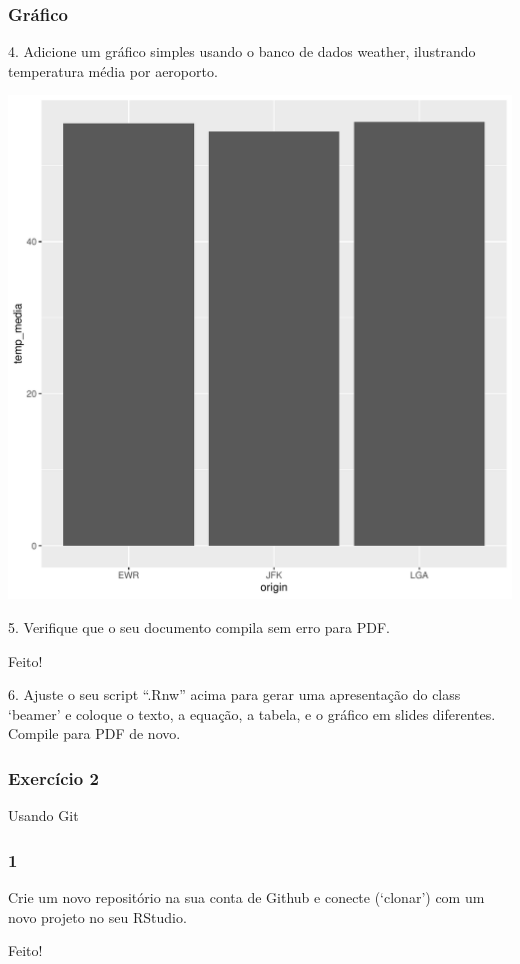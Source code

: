 \documentclass{beamer}\usepackage[]{graphicx}\usepackage[]{xcolor}
\makeatletter
\def\maxwidth{ %
  \ifdim\Gin@nat@width>\linewidth
    \linewidth
  \else
    \Gin@nat@width
  \fi
}
\newenvironment{knitrout}{}{} %
\makeatother
\begin{document}
\begin{frame}[fragile]
\frametitle{Gráfico}
4. Adicione um gráfico simples usando o banco de dados weather, ilustrando temperatura média por aeroporto.

\begin{knitrout}
\color{fgcolor}
\includegraphics[width=\maxwidth]{figure/unnamed-chunk-2-1} 
\end{knitrout}
\end{frame}

\begin{frame}
5. Verifique que o seu documento compila sem erro para PDF.

Feito!
\end{frame}

\begin{frame}
6. Ajuste o seu script “.Rnw” acima para gerar uma apresentação do class ‘beamer’ e coloque o texto, a equação, a tabela, e o gráfico em slides diferentes. Compile para PDF de novo.
\end{frame}

\begin{frame}
\frametitle{Exercício 2}
Usando Git
\end{frame}

\begin{frame}
\frametitle{1}
Crie um novo repositório na sua conta de Github e conecte (‘clonar’) com um novo projeto no seu RStudio.

Feito!
\end{frame}
\end{document}

